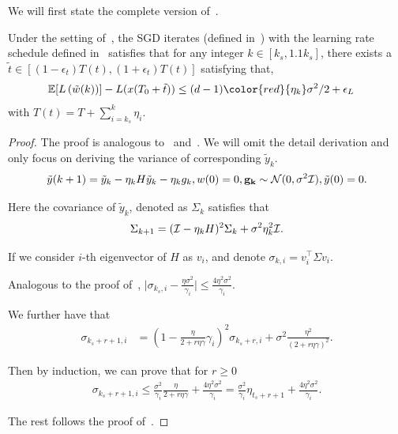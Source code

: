 We will first state the complete version of~.

\begin{theorem}
\label{thm:decay}
Under the setting of~, the SGD iterates (defined in~) with the learning rate schedule defined in~ satisfies that for any integer $k \in [k_s, 1.1 k_s]$, there exists a $\tilde t \in [(1 - \epsilon_{t}) T(t), (1 + \epsilon_t) T(t)]$ satisfying that, 
\begin{align*}
\E[L\left( \tilde w (k)\right)] - L( x(T_0  + \tilde t))& \le  {(d - 1) {\color{red}{ \eta_k}} \sigma^2}/{2} + \epsilon_{L} 
\end{align*}
with $T(t) = T + \sum\limits_{i = k_s}^{k} \eta_i$.
\end{theorem}

\begin{proof}
    The proof is analogous to~ and~. We will omit the detail derivation and only focus on deriving the variance of corresponding $\tilde y_k$.
    \begin{align*}
        \tilde y(k + 1) = \tilde y_k - \eta_k H \tilde y_k - \eta_k {g}_k, w(0) = 0,\mathbf{{g}_k} \sim \mathcal{N}(0, \sigma^2 \mathcal{I}), \tilde y(0) = 0.
    \end{align*}
    
    Here the covariance of $\tilde y_k$, denoted as $\Sigma_k$ satisfies that
    \begin{align*}
        \Sigma_{k + 1} = (\mathcal{I} - \eta_k H)^2 \Sigma_{k} + \sigma^2 \eta_k^2 \mathcal{I}.
    \end{align*}


    If we consider $i$-th eigenvector of $H$ as $v_i$, and denote $\sigma_{k,i} = v_i^\top \Sigma v_i$.

    Analogous to the proof of~, $\Big | \sigma_{k_s, i}  - \frac{\eta \sigma^2}{\gamma_i} \Big | \le \frac{4 \eta^2 \sigma^2}{\gamma_i}$.


    We further have that
    \begin{align*}
        \sigma_{k_s + r + 1, i} &= (1 - \frac{\eta}{2 + r \eta \gamma} \gamma_i)^2  \sigma_{k_s + r , i} + \sigma^2 \frac{\eta^2}{(2 + r \eta \gamma)^2}.
    \end{align*}

    Then by induction, we can prove that for $r \ge 0$
    \begin{align*}
        \sigma_{k_s + r + 1, i}  \le  \frac{\sigma^2}{\gamma_i} \frac{\eta}{2 + r \eta \gamma} + \frac{4 \eta^2 \sigma^2}{\gamma_i} = \frac{\sigma^2}{\gamma_i} \eta_{t_s + r + 1} + \frac{4 \eta^2 \sigma^2}{\gamma_i}.
    \end{align*}

    The rest follows the proof of~.
\end{proof}


